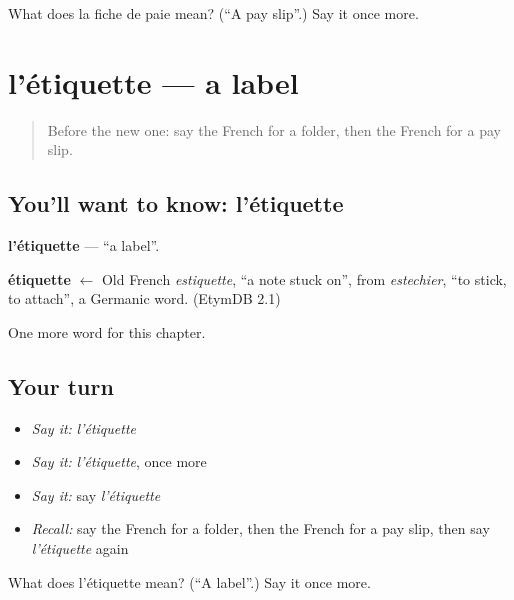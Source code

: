 \begin{tcolorbox}[breakable,colback=teal!4,colframe=teal!35!black,title={Before you move on}]
What does la fiche de paie mean? (\textquotedblleft{}A pay slip\textquotedblright{}.) Say it once more.
\end{tcolorbox}
\section[l'étiquette]{l'étiquette — a label}

\label{lesson:FR-C169-etiquette}



\begin{quote}
Before the new one: say the French for a folder, then the French for a pay slip.
\end{quote}

\subsection*{You'll want to know: l'étiquette}
\textbf{l'étiquette} — \textquotedblleft{}a label\textquotedblright{}.

\begin{cousinweb}
\textbf{étiquette} $\leftarrow$ Old French \emph{estiquette}, \textquotedblleft{}a note stuck on\textquotedblright{}, from \emph{estechier}, \textquotedblleft{}to stick, to attach\textquotedblright{}, a Germanic word. (EtymDB 2.1)
\end{cousinweb}

\begin{grammarlens}[title={What you've built}]
One more word for this chapter.
\end{grammarlens}

\subsection*{Your turn}
\begin{itemize}
\raggedright
  \item \emph{Say it:} \emph{l'étiquette}
  \item \emph{Say it:} \emph{l'étiquette}, once more
  \item \emph{Say it:} say \emph{l'étiquette}
  \item \emph{Recall:} say the French for a folder, then the French for a pay slip, then say \emph{l'étiquette} again
\end{itemize}

\begin{tcolorbox}[breakable,colback=teal!4,colframe=teal!35!black,title={Before you move on}]
What does l'étiquette mean? (\textquotedblleft{}A label\textquotedblright{}.) Say it once more.
\end{tcolorbox}
